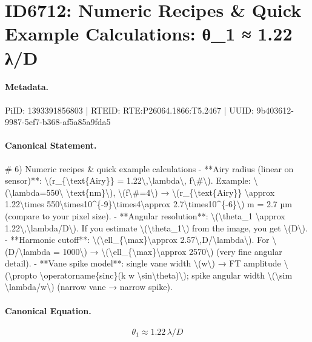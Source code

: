 \section*{ID6712: Numeric Recipes \& Quick Example Calculations: θ\_1 ≈ 1.22 λ/D}
\paragraph{Metadata.}
PiID: 1393391856803 | RTEID: RTE:P26064.1866:T5.2467 | UUID: 9b403612-9987-5ef7-b368-af5a85a9fda5

\paragraph{Canonical Statement.}
\# 6) Numeric recipes \& quick example calculations - **Airy radius (linear on sensor)**: \textbackslash{}(r\_\{\textbackslash{}text\{Airy\}\} = 1.22\textbackslash{},\textbackslash{}lambda\textbackslash{}, f\textbackslash{}\#\textbackslash{}). Example: \textbackslash{}(\textbackslash{}lambda=550\textbackslash{} \textbackslash{}text\{nm\}\textbackslash{}), \textbackslash{}(f\textbackslash{}\#=4\textbackslash{}) → \textbackslash{}(r\_\{\textbackslash{}text\{Airy\}\} \textbackslash{}approx 1.22\textbackslash{}times 550\textbackslash{}times10\textasciicircum{}\{-9\}\textbackslash{}times4\textbackslash{}approx 2.7\textbackslash{}times10\textasciicircum{}\{-6\}\textbackslash{}) m = 2.7 µm (compare to your pixel size). - **Angular resolution**: \textbackslash{}(\textbackslash{}theta\_1 \textbackslash{}approx 1.22\textbackslash{},\textbackslash{}lambda/D\textbackslash{}). If you estimate \textbackslash{}(\textbackslash{}theta\_1\textbackslash{}) from the image, you get \textbackslash{}(D\textbackslash{}). - **Harmonic cutoff**: \textbackslash{}(\textbackslash{}ell\_\{\textbackslash{}max\}\textbackslash{}approx 2.57\textbackslash{},D/\textbackslash{}lambda\textbackslash{}). For \textbackslash{}(D/\textbackslash{}lambda = 1000\textbackslash{}) → \textbackslash{}(\textbackslash{}ell\_\{\textbackslash{}max\}\textbackslash{}approx 2570\textbackslash{}) (very fine angular detail). - **Vane spike model**: single vane width \textbackslash{}(w\textbackslash{}) → FT amplitude \textbackslash{}(\textbackslash{}propto \textbackslash{}operatorname\{sinc\}(k w \textbackslash{}sin\textbackslash{}theta)\textbackslash{}); spike angular width \textbackslash{}(\textbackslash{}sim \textbackslash{}lambda/w\textbackslash{}) (narrow vane → narrow spike).

\paragraph{Canonical Equation.}
\[
\theta_1 \approx 1.22\,\lambda/D
\]

